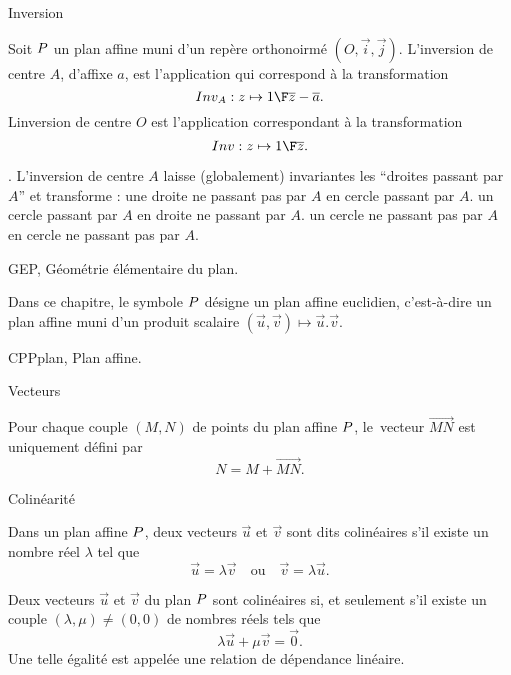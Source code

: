 \Concept [] Inversion

\noindent
Soit $\sc P$ un plan affine muni d'un rep\`ere orthonoirm\'e $(O,\vec i,\vec j)$. L'inversion de centre $A$, d'affixe $a$, est l'application qui correspond \`a la transformation 
$$
{Inv_A:z\mapsto{1\F\overline z-\overline a}}.
$$
Linversion de centre $O$ est l'application correspondant \`a la transformation 
$$
{Inv:z\mapsto{1\F\overline z}}.
$$

\Remarque. L'inversion de centre $A$ laisse (globalement) invariantes les ``droites passant par $A$'' et transforme : 
\Bullet une droite ne passant pas par $A$ en cercle passant par $A$.
\Bullet un cercle passant par $A$ en droite ne passant par $A$. 
\Bullet un cercle ne passant pas par $A$ en cercle ne passant pas par $A$. 





















\Chapter GEP, G\'eom\'etrie \'el\'ementaire du plan.

\noindent
Dans ce chapitre, le symbole $\sc P$ d\'esigne un plan affine euclidien, c'est-\`a-dire un plan affine muni d'un produit scalaire $(\vec u,\vec v)\mapsto\vec u.\vec v$. 



\Section CPPplan, Plan affine. 

\Concept [] Vecteurs
 
\noindent
Pour chaque couple $(M,N)$ de points du plan affine $\sc P$, le~vecteur $\vec{MN}$ est uniquement d\'efini par 
$$
N=M+\vec{MN}.
$$

\Concept [] Colin\'earit\'e 

\noindent
Dans un plan affine $\sc P$, deux vecteurs $\vec u$ et $\vec v$ sont dits colin\'eaires s'il existe un nombre r\'eel $\lambda$ tel que 
$$
\vec u=\lambda\vec v\quad\mbox{ou}\quad\vec v=\lambda\vec u.
$$

\Propriete []  Deux vecteurs $\vec u$ et $\vec v$ du plan $\sc P$ sont colin\'eaires si, et seulement s'il existe un couple $(\lambda,\mu)\neq(0,0)$ de nombres r\'eels tels que 
$$
\lambda \vec u+\mu\vec v=\vec 0.
$$
Une telle \'egalit\'e est appel\'ee une relation de d\'ependance lin\'eaire. 

